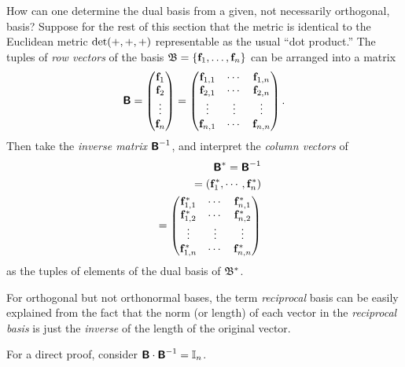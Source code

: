 How can one determine the dual basis from a given,
not necessarily orthogonal, basis?
Suppose for the rest of this section that the metric is identical to the Euclidean metric ${\rm det}(+,+,+)$ representable as the usual ``dot product.''
The tuples of {\em row vectors} of the basis ${\frak B} = \{{\bf f}_1,\ldots , {\bf f}_n\}$
can be arranged into a matrix
\begin{equation}
\textsf{\textbf{B}}
=
\begin{pmatrix}
{\bf f}_{1}\\
{\bf f}_{2}\\
\vdots  \\
{\bf f}_{n}
\end{pmatrix}
=
\begin{pmatrix}
{\bf f}_{1,1}&\cdots & {\bf f}_{1,n}\\
{\bf f}_{2,1}&\cdots & {\bf f}_{2,n}\\
\vdots&\vdots & \vdots \\
{\bf f}_{n,1}&\cdots & {\bf f}_{n,n}
\end{pmatrix}
.
\end{equation}
Then take the
{\em inverse matrix}
$\textsf{\textbf{B}}^{-1}$,
and interpret the
{\em column vectors} of
\begin{equation}
\begin{split}
\textsf{\textbf{B}}^{\ast}=\textsf{\textbf{B}}^{-1}
\\
\quad
=\left({\bf f}_{1}^\ast ,\cdots , {\bf f}_{n}^\ast\right)
\\
\quad
=
\begin{pmatrix}
{\bf f}_{1,1}^\ast&\cdots & {\bf f}_{n,1}^\ast\\
{\bf f}_{1,2}^\ast&\cdots & {\bf f}_{n,2}^\ast\\
\vdots&\vdots & \vdots \\
{\bf f}_{1,n}^\ast&\cdots & {\bf f}_{n,n}^\ast
\end{pmatrix}
\end{split}
\end{equation}
as the tuples of elements of the dual basis of ${\frak B}^*$.

For orthogonal but not orthonormal bases, the term {\em reciprocal} basis
can be easily explained from the fact that the norm (or length) of each vector in the {\em reciprocal basis}
is just the {\em inverse} of the length of the original vector.

{\color{OliveGreen}
\bproof
For a direct proof, consider $\textsf{\textbf{B}}\cdot \textsf{\textbf{B}}^{-1} ={\Bbb I}_n$.
\eproof
}


